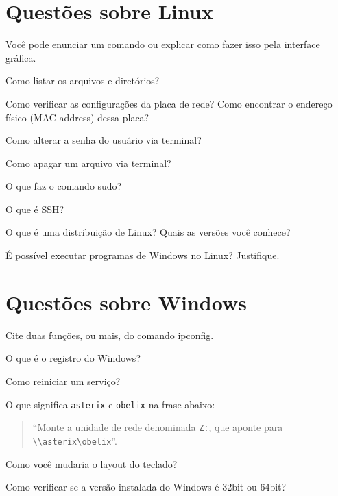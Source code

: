 


\siheader
\section*{Questões sobre Linux}
Você pode enunciar um comando ou explicar como fazer isso pela interface
gráfica.

\begin{questions}

\question
Como listar os arquivos e diretórios?
\vfill

\question
Como verificar as configurações da placa de rede? Como encontrar o
endereço físico (MAC address) dessa placa?
\vfill

\question
Como alterar a senha do usuário via terminal?
\vfill

\question
Como apagar um arquivo via terminal?
\vfill

\question
O que faz o comando sudo?
\vfill

\question
O que é SSH?
\vfill

\question
O que é uma distribuição de Linux? Quais as versões você conhece?
\vfill

\question
É possível executar programas de Windows no Linux? Justifique.
\vfill

\end{questions}
\newpage


\siheader
\section*{Questões sobre Windows}
\begin{questions}

\question
Cite duas funções, ou mais, do comando ipconfig.
\vfill

\question
O que é o registro do Windows?
\vfill

\question
Como reiniciar um serviço?
\vfill

\question
O que significa \verb+asterix+ e \verb+obelix+ na frase abaixo:
\begin{quote}
    ``Monte a unidade de rede denominada \verb+Z:+, que aponte para \verb+\\asterix\obelix+''.
\end{quote}
\vfill

\question
Como você mudaria o layout do teclado?
\vfill

\question
Como verificar se a versão instalada do Windows é 32bit ou 64bit?
\vfill

\end{questions}
\newpage


